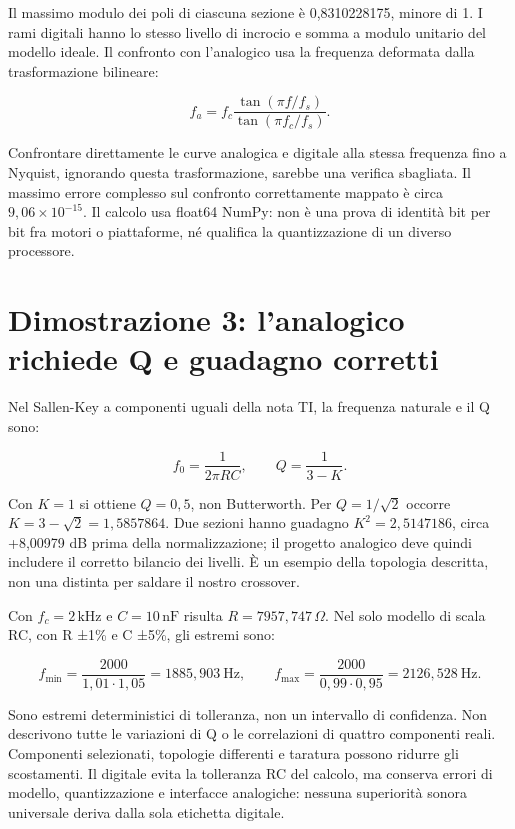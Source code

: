 \documentclass[
  italian,
  11pt,
  a4paper,
]{article}
\begin{document}
Il massimo modulo dei poli di ciascuna sezione è 0,8310228175, minore di 1. I rami digitali
hanno lo stesso livello di incrocio e somma a modulo unitario del modello ideale. Il
confronto con l'analogico usa la frequenza deformata dalla trasformazione bilineare:

\[f_a=f_c\frac{\tan(\pi f/f_s)}{\tan(\pi f_c/f_s)}.\]

Confrontare direttamente le curve analogica e digitale alla stessa frequenza fino a Nyquist,
ignorando questa trasformazione, sarebbe una verifica sbagliata. Il massimo errore complesso
sul confronto correttamente mappato è circa \(9{,}06\times10^{-15}\). Il calcolo usa float64
NumPy: non è una prova di identità bit per bit fra motori o piattaforme, né qualifica la
quantizzazione di un diverso processore.

\section{Dimostrazione 3: l'analogico richiede Q e guadagno
corretti}\label{dimostrazione-3-lanalogico-richiede-q-e-guadagno-corretti}

Nel Sallen-Key a componenti uguali della nota TI, la frequenza naturale e il Q sono:

\[f_0=\frac{1}{2\pi RC},\qquad Q=\frac{1}{3-K}.\]

Con \(K=1\) si ottiene \(Q=0{,}5\), non Butterworth. Per \(Q=1/\sqrt{2}\) occorre
\(K=3-\sqrt{2}=1{,}5857864\). Due sezioni hanno guadagno \(K^2=2{,}5147186\), circa +8,00979
dB prima della normalizzazione; il progetto analogico deve quindi includere il corretto
bilancio dei livelli. È un esempio della topologia descritta, non una distinta per saldare
il nostro crossover.

Con \(f_c=2\,\mathrm{kHz}\) e \(C=10\,\mathrm{nF}\) risulta \(R=7957{,}747\,\Omega\). Nel
solo modello di scala RC, con R ±1\% e C ±5\%, gli estremi sono:

\[f_{\min}=\frac{2000}{1{,}01\cdot1{,}05}=1885{,}903\ \mathrm{Hz},\qquad f_{\max}=\frac{2000}{0{,}99\cdot0{,}95}=2126{,}528\ \mathrm{Hz}.\]

Sono estremi deterministici di tolleranza, non un intervallo di confidenza. Non descrivono
tutte le variazioni di Q o le correlazioni di quattro componenti reali. Componenti
selezionati, topologie differenti e taratura possono ridurre gli scostamenti. Il digitale
evita la tolleranza RC del calcolo, ma conserva errori di modello, quantizzazione e
interfacce analogiche: nessuna superiorità sonora universale deriva dalla sola etichetta
digitale.
\end{document}
